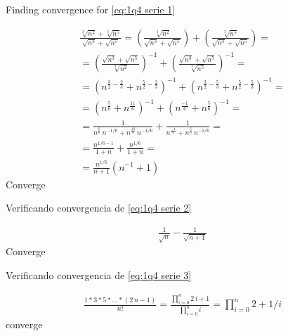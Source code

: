 \documentclass["AM3C-tests_resolutions.tex"]{subfiles}
\begin{document}
\begin{questionBox}
  Finding convergence for \eqref{eq:1q4 serie 1}
  \begin{tcolorbox}
    \begin{gather*}
      \frac{
        \sqrt[3]{n^2}+\sqrt[3]{n^5}
      }{
        \sqrt{n^3}+\sqrt{n^5}
      }
      = 
      \left(
        \frac{
          \sqrt[3]{n^2}
        }{
          \sqrt{n^3}+\sqrt{n^5}
        }
      \right)
      + 
      \left(
        \frac{
          \sqrt[3]{n^5}
        }{
          \sqrt{n^3}+\sqrt{n^5}
        }
      \right)
      = \\
      = 
      \left(
        \frac{
          \sqrt{n^3}+\sqrt{n^5}
        }{
          \sqrt[3]{n^2}
        }
      \right)^{-1}
      + 
      \left(
        \frac{
          \sqrt{n^3}+\sqrt{n^5}
        }{
          \sqrt[3]{n^5}
        }
      \right)^{-1}
      = \\ 
      = 
      \left(
        n^{
          \frac{3}{2}
          -\frac{2}{3}
        }
        + n^{
          \frac{5}{2}
          -\frac{2}{3}
        }
      \right)^{-1}
      + 
      \left(
        n^{
          \frac{3}{2}
          - \frac{5}{3}
        }
        + n^{
          \frac{5}{2}
          - \frac{5}{3}
        }
      \right)^{-1}
      = \\ 
      = 
      \left(
        n^{
          \frac{5}{6}
        }
        + n^{
          \frac{11}{6}
        }
      \right)^{-1}
      + 
      \left(
        n^{
          \frac{-1}{6}
        }
        + n^{
          \frac{5}{6}
        }
      \right)^{-1}
      = \\ 
      = 
      \frac{1}{
        n^{ \frac{6}{6} }
        \,n^{-1/6}
        + n^{ \frac{12}{6} }
        \,n^{-1/6}
      }
      + 
      \frac{1}{
        n^{ \frac{-1}{6} }
        + n^{ \frac{6}{6} }
        \,n^{-1/6}
      }
      = \\ 
      = 
      \frac{n^{1/6-1}}{
        1 + n
      }
      + 
      \frac{n^{1/6}}{
        1 + n
      }
      = \\ 
      = 
      \frac{n^{1/6}}{n+1}
      ( n^{-1}+1)
    \end{gather*}
    Converge
  \end{tcolorbox}

  Verificando convergencia de \eqref{eq:1q4 serie 2}
  \begin{tcolorbox}
    \begin{gather*}
      \frac{1}{\sqrt{n}}
      -\frac{1}{\sqrt{n+1}}
    \end{gather*}
    Converge
  \end{tcolorbox}

  Verificando convergencia de \eqref{eq:1q4 serie 3}
  \begin{tcolorbox}
    \begin{gather*}
      \frac{
        1*3*5*\dots*(2\,n-1)
      }{
        n!
      }
      =
      \frac{
        \prod_{i=0}^{n}{2\,i+1}
      }{
        \prod_{i=0}^n{i}
      }
      = \prod_{i=0}^{n}{2+1/i}
    \end{gather*}
    converge
  \end{tcolorbox}

\end{questionBox}
\end{document}
